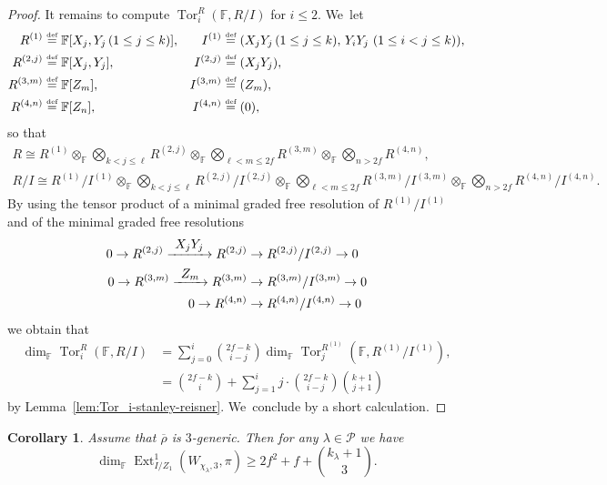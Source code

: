 \documentclass[JEP,XML,SOM,Unicode,NoFloatCountersInSection, NoEqCountersInSection,published]{cedram}
\newcommand{\To}[1]{\mathchoice{\xrightarrow{\textstyle\kern4pt#1\kern3pt}}{\stackrel{#1}{\longrightarrow}}{}{}}
\newcommand{\defeq}{\stackrel{\textrm{\tiny{\upshape{def}}}}{=}}
\newcommand{\F}{\mathbb{F}}
\renewcommand{\P}{\mathscr P}
\newcommand{\brho}{\overline{\rho}}
\DeclareMathOperator{\Ext}{Ext}
\DeclareMathOperator{\Tor}{Tor}
\theoremstyle{plain}
\newtheorem{cor}[prop]{Corollary}
\theoremstyle{definition}
\begin{document}
\begin{proof}
It remains to compute $\Tor_i^R(\F,R/I)$ for $i \le 2$. We~let\vspace*{-3pt}
\begin{align*}
R^{(1)} &\defeq \F[X_j, Y_j\, (1 \le j \le k)], & I^{(1)} &\defeq (X_jY_j\, (1 \le j \le k),\, Y_i Y_j\ (1 \le i < j \le k)), \\
R^{(2,j)} &\defeq \F[X_j, Y_j], & I^{(2,j)} &\defeq (X_jY_j), \\
R^{(3,m)} &\defeq \F[Z_m], & I^{(3,m)} &\defeq (Z_m), \\
R^{(4,n)} &\defeq \F[Z_n], & I^{(4,n)} &\defeq (0),
\end{align*}
so that\vspace*{-3pt}
\begin{gather*}
R \cong R^{(1)} \otimes_\F \bigotimes_{k < j \le \ell} R^{(2,j)} \otimes_\F \bigotimes_{\ell < m \le 2f} R^{(3,m)} \otimes_\F \bigotimes_{n > 2f} R^{(4,n)},\\
R/I \cong R^{(1)}/I^{(1)} \otimes_\F \bigotimes_{k < j \le \ell} R^{(2,j)}/I^{(2,j)} \otimes_\F \bigotimes_{\ell < m \le 2f} R^{(3,m)}/I^{(3,m)} \otimes_\F \bigotimes_{n > 2f} R^{(4,n)}/I^{(4,n)}.
\end{gather*}
By using the tensor product of a minimal graded free resolution of $R^{(1)}/I^{(1)}$ and of the minimal graded free resolutions\vspace*{-3pt}
\begin{align*}
0 \to R^{(2,j)} \To{X_jY_j} R^{(2,j)} &\to R^{(2,j)}/I^{(2,j)} \to 0 \\
0 \to R^{(3,m)} \To{Z_m} R^{(3,m)} &\to R^{(3,m)}/I^{(3,m)} \to 0 \\
0 \to R^{(4,n)} &\to R^{(4,n)}/I^{(4,n)} \to 0
\end{align*}
we obtain that\vspace*{-3pt}
\begin{align*}
\dim_\F \Tor_i^R(\F,R/I) &= \sum_{j=0}^i \binom{2f-k}{i-j} \dim_\F \Tor_j^{R^{(1)}}(\F,R^{(1)}/I^{(1)}),\\
&= \binom{2f-k}{i} + \sum_{j=1}^i j\cdot \binom{2f-k}{i-j} \binom{k+1}{j+1}
\end{align*}
by Lemma~\ref{lem:Tor_i-stanley-reisner}. We~conclude by a short calculation.
\end{proof}

\begin{cor}\label{cor:ext-i}
{Assume that $\brho$ is $3$-generic}.
Then for any $\lambda \in \P$ we have\vspace*{-3pt}
\begin{equation*}
\dim_\F \Ext^1_{I/Z_1}(W_{\chi_\lambda,3},\pi) \ge 2f^2+f+\binom{k_\lambda+1}3.
\end{equation*}
\end{cor}
\end{document}
